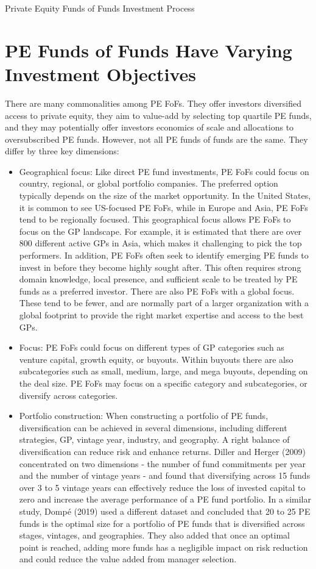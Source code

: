 \documentclass[11pt]{article}
\begin{document}
Private Equity Funds of Funds Investment Process

\section*{PE Funds of Funds Have Varying Investment Objectives}
There are many commonalities among PE FoFs. They offer investors diversified access to private equity, they aim to value-add by selecting top quartile PE funds, and they may potentially offer investors economics of scale and allocations to oversubscribed PE funds. However, not all PE funds of funds are the same. They differ by three key dimensions:

\begin{itemize}
  \item Geographical focus: Like direct PE fund investments, PE FoFs could focus on country, regional, or global portfolio companies. The preferred option typically depends on the size of the market opportunity. In the United States, it is common to see US-focused PE FoFs, while in Europe and Asia, PE FoFs tend to be regionally focused. This geographical focus allows PE FoFs to focus on the GP landscape. For example, it is estimated that there are over 800 different active GPs in Asia, which makes it challenging to pick the top performers. In addition, PE FoFs often seek to identify emerging PE funds to invest in before they become highly sought after. This often requires strong domain knowledge, local presence, and sufficient scale to be treated by PE funds as a preferred investor. There are also PE FoFs with a global focus. These tend to be fewer, and are normally part of a larger organization with a global footprint to provide the right market expertise and access to the best GPs.
  \item Focus: PE FoFs could focus on different types of GP categories such as venture capital, growth equity, or buyouts. Within buyouts there are also subcategories such as small, medium, large, and mega buyouts, depending on the deal size. PE FoFs may focus on a specific category and subcategories, or diversify across categories.
  \item Portfolio construction: When constructing a portfolio of PE funds, diversification can be achieved in several dimensions, including different strategies, GP, vintage year, industry, and geography. A right balance of diversification can reduce risk and enhance returns. Diller and Herger (2009) concentrated on two dimensions - the number of fund commitments per year and the number of vintage years - and found that diversifying across 15 funds over 3 to 5 vintage years can effectively reduce the loss of invested capital to zero and increase the average performance of a PE fund portfolio. In a similar study, Dompé (2019) used a different dataset and concluded that 20 to 25 PE funds is the optimal size for a portfolio of PE funds that is diversified across stages, vintages, and geographies. They also added that once an optimal point is reached, adding more funds has a negligible impact on risk reduction and could reduce the value added from manager selection.
\end{itemize}
\end{document}
